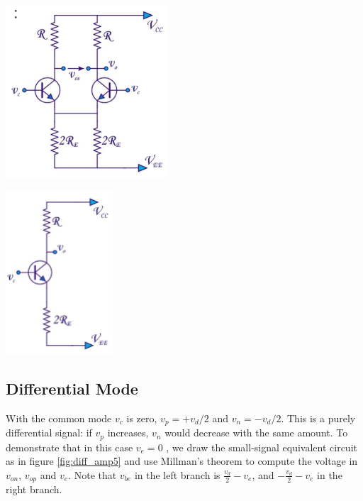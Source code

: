 \begin{minipage}{.5\textwidth}
	\centering
	\includegraphics[width=6cm]{figures/ch02/diff_amp3.jpg}
	\label{fig:diff_amp3}
\end{minipage}%
\begin{minipage}{.5\textwidth}
	\centering
	\includegraphics[width=4cm]{figures/ch02/diff_amp4.jpg}
	\label{fig:diff_amp4}
\end{minipage}

\subsection{Differential Mode}

With the common mode $v_c$ is zero, $v_p = + v_d/2$ and $v_n = -v_d/2$. This is a purely differential signal: if $v_p$ increases, $v_n$ would decrease with the same amount. To demonstrate that in this case $v_e = 0$ , we draw the small-signal equivalent circuit as in figure \ref{fig:diff_amp5} and use Millman's theorem to compute the voltage in $v_{on}$, $v_{op}$ and $v_e$. Note that $v_{be}$ in the left branch is $\frac{v_d}{2} - v_e$, and $-\frac{v_d}{2} - v_e$ in the right branch.

